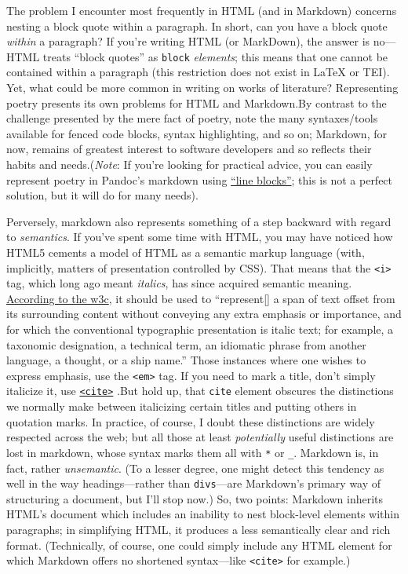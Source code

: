 \documentclass[
  12pt,
]{article}
\begin{document}
The problem I encounter most frequently in HTML (and in Markdown)
concerns nesting a block quote within a paragraph. In short, can you
have a block quote \emph{within} a paragraph? If you're writing HTML (or
MarkDown), the answer is no---HTML treats ``block quotes'' as
\texttt{block} \emph{elements}; this means that one cannot be contained
within a paragraph (this restriction does not exist in LaTeX or TEI).
Yet, what could be more common in writing on works of literature?
Representing poetry presents its own problems for HTML and Markdown.{By
contrast to the challenge presented by the mere fact of poetry, note the
many syntaxes/tools available for fenced code blocks, syntax
highlighting, and so on; Markdown, for now, remains of greatest interest
to software developers and so reflects their habits and
needs.}(\emph{Note}: If you're looking for practical advice, you can
easily represent poetry in Pandoc's markdown using
\href{http://pandoc.org/README.html\#line-blocks}{``line blocks''}; this
is not a perfect solution, but it will do for many needs).

Perversely, markdown also represents something of a step backward with
regard to \emph{semantics}. If you've spent some time with HTML, you may
have noticed how HTML5 cements a model of HTML as a semantic markup
language (with, implicitly, matters of presentation controlled by CSS).
That means that the \texttt{\textless{}i\textgreater{}} tag, which long
ago meant \emph{italics}, has since acquired semantic meaning.
\href{https://docs.webplatform.org/wiki/html/elements/i}{According to
the w3c}, it should be used to ``represent{[}{]} a span of text offset
from its surrounding content without conveying any extra emphasis or
importance, and for which the conventional typographic presentation is
italic text; for example, a taxonomic designation, a technical term, an
idiomatic phrase from another language, a thought, or a ship name.''
Those instances where one wishes to express emphasis, use the
\texttt{\textless{}em\textgreater{}} tag. If you need to mark a title,
don't simply italicize it, use
\href{https://docs.webplatform.org/wiki/html/elements/cite}{\texttt{\textless{}cite\textgreater{}}}
.{But hold up, that \texttt{cite} element obscures the distinctions we
normally make between italicizing certain titles and putting others in
quotation marks.} In practice, of course, I doubt these distinctions are
widely respected across the web; but all those at least
\emph{potentially} useful distinctions are lost in markdown, whose
syntax marks them all with \texttt{*} or \texttt{\_}. Markdown is, in
fact, rather \emph{unsemantic}. (To a lesser degree, one might detect
this tendency as well in the way headings---rather than
\texttt{divs}---are Markdown's primary way of structuring a document,
but I'll stop now.) So, two points: Markdown inherits HTML's document
which includes an inability to nest block-level elements within
paragraphs; in simplifying HTML, it produces a less semantically clear
and rich format. (Technically, of course, one could simply include any
HTML element for which Markdown offers no shortened syntax---like
\texttt{\textless{}cite\textgreater{}} for example.)
\end{document}
